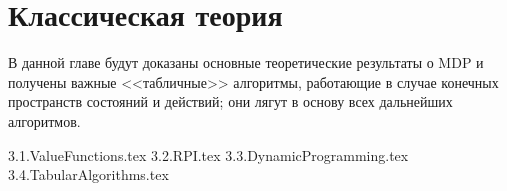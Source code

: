 \chapter{Классическая теория}\label{classictheorychapter}

В данной главе будут доказаны основные теоретические результаты о MDP и получены важные <<табличные>> алгоритмы, работающие в случае конечных пространств состояний и действий; они лягут в основу всех дальнейших алгоритмов. 

{3.1.ValueFunctions.tex}
{3.2.RPI.tex}
{3.3.DynamicProgramming.tex}
{3.4.TabularAlgorithms.tex}